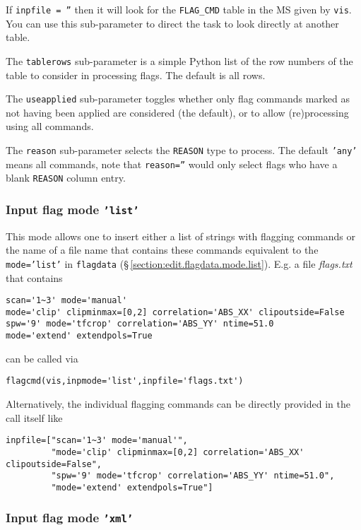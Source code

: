 If {\tt inpfile = ''} then it will look for the {\tt FLAG\_CMD} 
table in the MS given by {\tt vis}. You can use this sub-parameter to
direct the task to look directly at another table.

The {\tt tablerows} sub-parameter is a simple Python list of the row
numbers of the table to consider in processing flags.  The default is
all rows.

The {\tt useapplied} sub-parameter toggles whether only flag commands
marked as not having been applied are considered (the default), or
to allow (re)processing using all commands.

The {\tt reason} sub-parameter selects the {\tt REASON} type to
process.  The default {\tt 'any'} means all commands, note that
{\tt reason=''} would only select flags who have a blank {\tt REASON}
column entry.



\subsubsection{Input flag mode {\tt 'list'}}
\label{section:edit.flagcmd.inpmode.list}
This mode allows one to insert either a list of strings with flagging
commands or the name of a file name that contains these commands
equivalent to the {\tt mode='list'} in {\tt flagdata}
(\S\,\ref{section:edit.flagdata.mode.list}). E.g. a file {\it
  flags.txt} that contains 
\small
\begin{verbatim}
scan='1~3' mode='manual'
mode='clip' clipminmax=[0,2] correlation='ABS_XX' clipoutside=False
spw='9' mode='tfcrop' correlation='ABS_YY' ntime=51.0
mode='extend' extendpols=True
\end{verbatim}
\normalsize
can be called via  
\small
\begin{verbatim}
flagcmd(vis,inpmode='list',inpfile='flags.txt')
\end{verbatim}
\normalsize

Alternatively, the individual flagging commands can
be directly provided in the call itself like 
\small
\begin{verbatim}
inpfile=["scan='1~3' mode='manual'", 
         "mode='clip' clipminmax=[0,2] correlation='ABS_XX' clipoutside=False",
         "spw='9' mode='tfcrop' correlation='ABS_YY' ntime=51.0",
         "mode='extend' extendpols=True"]
\end{verbatim}
\normalsize



\subsubsection{Input flag mode {\tt 'xml'}}
\label{section:edit.flagcmd.inpmode.xml}

